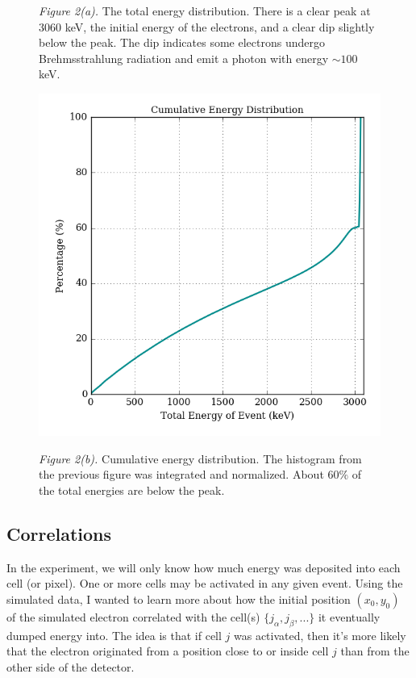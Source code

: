 \documentclass[12pt]{article}
\begin{document}
\begin{center}
\begin{figure}
\textit{Figure 2(a).} The total energy distribution. There is a clear peak at 3060 keV, the initial energy of the electrons, and a clear dip slightly below the peak. The dip indicates some electrons undergo Brehmsstrahlung radiation and emit a photon with energy $\sim 100$ keV.
\end{figure}
\begin{figure}
\includegraphics[scale=0.9]{../figures/percentile.png}

\textit{Figure 2(b).} Cumulative energy distribution. The histogram from the previous figure was integrated and normalized. About 60$\%$ of the total energies are below the peak. 
\end{figure}
\end{center}

\subsection{Correlations}

In the experiment, we will only know how much energy was deposited into each cell (or pixel). One or more cells may be activated in any given event. Using the simulated data, I wanted to learn more about how the initial position $(x_0,y_0)$ of the simulated electron correlated with the cell(s) $\{ j_\alpha, j_\beta, ... \}$ it eventually dumped energy into. The idea is that if cell $j$ was activated, then it's more likely that the electron originated from a position close to or inside cell $j$ than from the other side of the detector. \\
\end{document}
